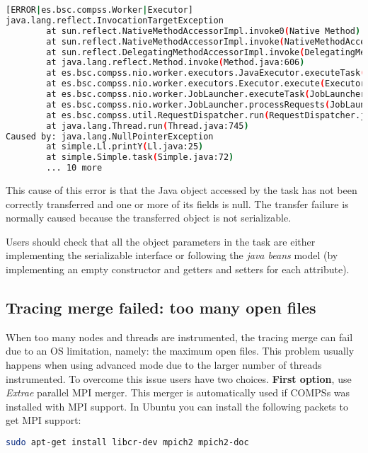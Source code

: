 \begin{lstlisting}[language=bash]
[ERROR|es.bsc.compss.Worker|Executor]
java.lang.reflect.InvocationTargetException
        at sun.reflect.NativeMethodAccessorImpl.invoke0(Native Method)
        at sun.reflect.NativeMethodAccessorImpl.invoke(NativeMethodAccessorImpl.java:57)
        at sun.reflect.DelegatingMethodAccessorImpl.invoke(DelegatingMethodAccessorImpl.java:43)
        at java.lang.reflect.Method.invoke(Method.java:606)
        at es.bsc.compss.nio.worker.executors.JavaExecutor.executeTask(JavaExecutor.java:154)
        at es.bsc.compss.nio.worker.executors.Executor.execute(Executor.java:42)
        at es.bsc.compss.nio.worker.JobLauncher.executeTask(JobLauncher.java:46)
        at es.bsc.compss.nio.worker.JobLauncher.processRequests(JobLauncher.java:34)
        at es.bsc.compss.util.RequestDispatcher.run(RequestDispatcher.java:46)
        at java.lang.Thread.run(Thread.java:745)
Caused by: java.lang.NullPointerException
        at simple.Ll.printY(Ll.java:25)
        at simple.Simple.task(Simple.java:72)
        ... 10 more
\end{lstlisting}

This cause of this error is that the Java object accessed by the task has not been correctly transferred and one or more of its fields
is null. The transfer failure is normally caused because the transferred object is not serializable. 

Users should check that all the object parameters in the task are either implementing the serializable interface or following 
the \textit{java beans} model (by implementing an empty constructor and getters and setters for each attribute).

\subsection{Tracing merge failed: too many open files}

When too many nodes and threads are instrumented, the tracing merge can fail due to an OS limitation, namely: the maximum open files. This problem usually happens when using advanced mode due to the larger number of threads instrumented. To overcome this issue users have two choices. \textbf{First option}, use \textit{Extrae} parallel MPI merger. This merger is automatically used if COMPSs was installed with MPI support. In Ubuntu you can install the following packets to get MPI support:

\begin{lstlisting}[language=bash]
sudo apt-get install libcr-dev mpich2 mpich2-doc
\end{lstlisting}

